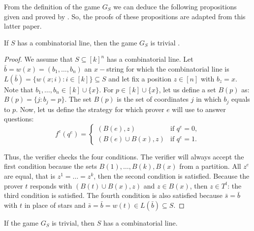 From the definition of the game $G_S$ we can deduce the following propositions given and proved by \cite{hkazla2016forbidden}. So, the proofs of these propositions are adapted from this latter paper.  
\begin{pro} If $S$ has a combinatorial line, then the game $G_S$ is trivial	. \label{pr1}	\end{pro}
\begin{proof}
We assume that $S \subseteq [k]^n$ has a combinatorial line. 
Let $\bar{b}=w(x)=(b_1,\ldots, b_n)$ an $x-$string for which the  combinatorial line is $L(\bar{b})=\{w(x;i): i \in [k]\} \subseteq S$ and let fix a position $z \in [n]$ with $b_z=x$. Note that $b_1,\ldots, b_n \in [k] \cup \{x\}$. For $p \in [k] \cup \{x\}$, let us define a set $B(p)$ as: $B(p)=\{j: b_j=p\}$. The set $B(p)$ is the set of coordinates $j$ in which $b_j$ equals  to $p.$ Now, let us define the  strategy for which prover $e$ will use to answer questions:
$$ f^e(q^e)=\left\lbrace \begin{array}{ll} (B(e),z) & \text{if } q^e=0, \\ (B(e) \cup B(x), z) & \text{if } q^e=1.\end{array} \right. $$

Thus, the verifier checks the four conditions. The verifier will always accept the first condition because the sets $B(1), \ldots, B(k), B(x)$ from a partition. All $z^e$ are equal, that is $z^1=\ldots=z^k$, then the second condition is satisfied. Because the prover $t$ responds with  $(B(t) \cup B(x), z)$ and $z \in B(x)$, then $z \in T^t$: the third condition is satisfied. The fourth condition is also satisfied because $\bar{s}=\bar{b}$ with $t$ in place of stars and $\bar{s}=\bar{b} =w(t) \in L(\bar{b}) \subseteq S.$
\end{proof}

\begin{pro} If the game $G_S$ is trivial, then $S$ has a combinatorial line.	 \label{pr2}	\end{pro}

